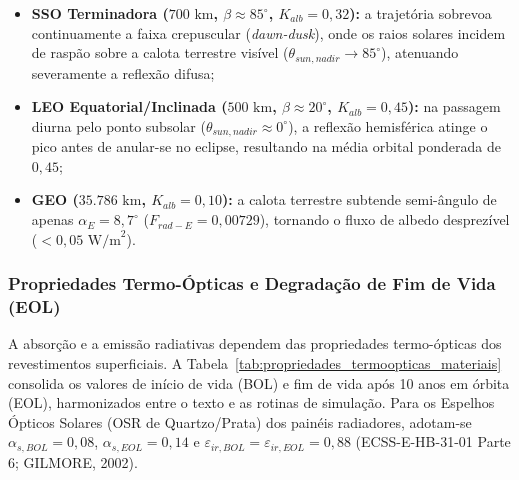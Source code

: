 \begin{itemize}[noitemsep,topsep=2pt,leftmargin=*]
    \item \textbf{SSO Terminadora ($700\text{ km}$, $\beta \approx 85^\circ$, $K_{alb} = 0{,}32$):} a trajetória sobrevoa continuamente a faixa crepuscular (\textit{dawn-dusk}), onde os raios solares incidem de raspão sobre a calota terrestre visível ($\theta_{sun,nadir} \to 85^\circ$), atenuando severamente a reflexão difusa;
    \item \textbf{LEO Equatorial/Inclinada ($500\text{ km}$, $\beta \approx 20^\circ$, $K_{alb} = 0{,}45$):} na passagem diurna pelo ponto subsolar ($\theta_{sun,nadir} \approx 0^\circ$), a reflexão hemisférica atinge o pico antes de anular-se no eclipse, resultando na média orbital ponderada de $0{,}45$;
    \item \textbf{GEO ($35.786\text{ km}$, $K_{alb} = 0{,}10$):} a calota terrestre subtende semi-ângulo de apenas $\alpha_E = 8{,}7^\circ$ ($F_{rad-E} = 0{,}00729$), tornando o fluxo de albedo desprezível ($< 0{,}05\text{ W/m}^2$).
\end{itemize}

\subsubsection{Propriedades Termo-Ópticas e Degradação de Fim de Vida (EOL)}

A absorção e a emissão radiativas dependem das propriedades termo-ópticas dos revestimentos superficiais. A Tabela~\ref{tab:propriedades_termoopticas_materiais} consolida os valores de início de vida (BOL) e fim de vida após 10 anos em órbita (EOL), harmonizados entre o texto e as rotinas de simulação. Para os Espelhos Ópticos Solares (OSR de Quartzo/Prata) dos painéis radiadores, adotam-se $\alpha_{s,BOL}=0{,}08$, $\alpha_{s,EOL}=0{,}14$ e $\varepsilon_{ir,BOL}=\varepsilon_{ir,EOL}=0{,}88$ (ECSS-E-HB-31-01 Parte 6; GILMORE, 2002).

